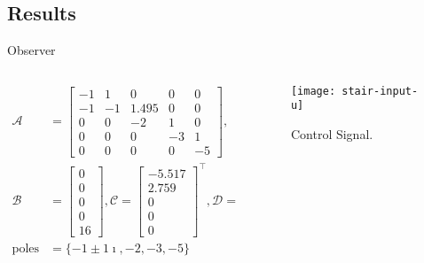 
\subsection{Results}%
\label{subsec:ts-results}

\begin{slide}{Observer}
  \begin{columns}[c]
    \begin{column}{0.55\textwidth}
      \begin{align}
        \mathcal{A}    & = \begin{bmatrix}
                             -1 & 1  & 0     & 0  & 0  \\
                             -1 & -1 & 1.495 & 0  & 0  \\
                             0  & 0  & -2    & 1  & 0  \\
                             0  & 0  & 0     & -3 & 1  \\
                             0  & 0  & 0     & 0  & -5
                           \end{bmatrix},        \\
        \mathcal{B}    & =\begin{bmatrix}
                            0 \\ 0 \\ 0 \\ 0 \\ 16
                          \end{bmatrix},
        \mathcal{C} = \begin{bmatrix}
                        -5.517 \\ 2.759 \\ 0 \\ 0 \\ 0
                      \end{bmatrix}^{\top},
        \mathcal{D} = 0                                     \\
        \textrm{poles} & = \{-1\pm{}1\imath{}, -2, -3, -5\}
      \end{align}
    \end{column}%
    \hfill%
    \begin{column}{0.55\textwidth}
      \begin{figure}[ht!]
        \centering
        \texttt{[image: stair-input-u]}
        \caption{Control Signal.}%
      \end{figure}
    \end{column}%
  \end{columns}
\end{slide}

